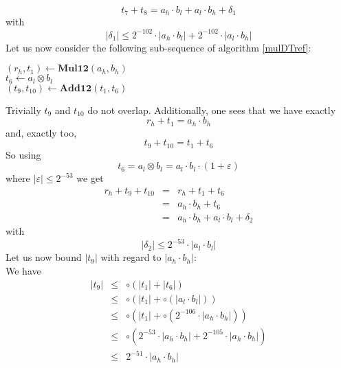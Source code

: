 \documentclass[a4paper,10pt,twoside]{article}
\newenvironment{proof}[1][Proof]{\begin{trivlist}
\item[\hskip \labelsep {\bfseries #1}]}{\end{trivlist}}
\newcommand{\hi}{\ensuremath{\mathit{h}}}
\newcommand{\lo}{\ensuremath{\mathit{l}}}
\newcommand{\mAdd}{\ensuremath{\mathbf{Add12}}}
\newcommand{\mMul}{\ensuremath{\mathbf{Mul12}}}
\renewcommand{\epsilon}{\varepsilon}
\begin{document}
\begin{proof}
$$t_7 + t_8 = a_\hi \cdot b_\lo + a_\lo \cdot b_\hi + \delta_1$$
with
$$\left \vert \delta_1 \right \vert \leq 2^{-102} \cdot \left \vert a_\hi \cdot b_\lo \right \vert + 
                                         2^{-102} \cdot \left \vert a_\lo \cdot b_\hi \right \vert$$ 
Let us now consider the following sub-sequence of algorithm \ref{mulDTref}:
\begin{center}
\begin{minipage}[b]{50mm}
$\left( r_\hi, t_1 \right) \gets \mMul\left( a_\hi, b_\hi \right)$ \\
$t_6 \gets a_\lo \otimes b_\lo$ \\
$\left( t_9, t_{10} \right) \gets \mAdd\left( t_1, t_6 \right)$ 
\end{minipage}
\end{center}
Trivially $t_9$ and $t_{10}$ do not overlap.
Additionally, one sees that we have exactly
$$r_\hi + t_1 = a_\hi \cdot b_\hi$$ 
and, exactly too, 
$$t_9 + t_{10} = t_1 + t_6$$
So using
$$t_6 = a_\lo \otimes b_\lo = a_\lo \cdot b_\lo \cdot \left( 1 + \epsilon \right)$$
where $\left \vert \epsilon \right \vert \leq 2^{-53}$ we get
\begin{eqnarray*}
r_\hi + t_9 + t_{10} & = & r_\hi + t_1 + t_6 \\
& = & a_\hi \cdot b_\hi + t_6 \\
& = & a_\hi \cdot b_\hi + a_\lo \cdot b_\lo + \delta_2
\end{eqnarray*}
with
$$\left \vert \delta_2 \right \vert \leq 2^{-53} \cdot \left \vert a_\lo \cdot b_\lo \right \vert$$
Let us now bound $\left \vert t_9 \right \vert$ with regard to $\left \vert a_\hi \cdot b_\hi \right \vert$:\\
We have
\begin{eqnarray*}
\left \vert t_9 \right \vert & \leq & \circ \left( \left \vert t_1 \right \vert + \left \vert t_6 \right \vert \right) \\
& \leq & \circ \left( \left \vert t_1 \right \vert + \circ \left( \left \vert a_\lo \cdot b_\lo \right \vert \right) \right) \\
& \leq & \circ \left( \left \vert t_1 \right \vert + \circ \left( 2^{-106} \cdot \left \vert a_\hi \cdot b_\hi \right \vert \right) \right) \\
& \leq & \circ \left( 2^{-53} \cdot \left \vert a_\hi \cdot b_\hi \right \vert + 2^{-105} \cdot \left \vert a_\hi \cdot b_\hi \right \vert \right) \\
& \leq & 2^{-51} \cdot \left \vert a_\hi \cdot b_\hi \right \vert 
\end{eqnarray*}

\end{proof}
\end{document}
